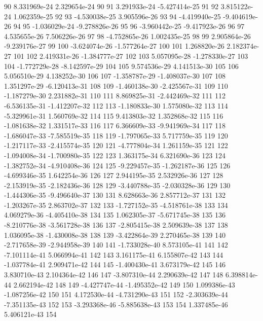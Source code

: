 \documentclass{article}
\begin{document}
\begin{Schunk}
\begin{Soutput}
90     8.331969e-24   2.329654e-24   90
91     3.291933e-24  -5.427414e-25   91
92     3.815122e-24   1.062359e-25   92
93    -4.530038e-25   3.905596e-26   93
94    -4.419940e-25  -9.404619e-26   94
95    -1.036029e-24  -9.278826e-26   95
96    -3.960442e-25  -9.417923e-26   96
97     4.535655e-26   7.506226e-26   97
98    -4.752865e-26   1.002435e-25   98
99     2.905864e-26  -9.239176e-27   99
100   -3.624074e-26  -1.577264e-27  100
101    1.268820e-26   2.182374e-27  101
102    2.419331e-26  -1.384777e-27  102
103    5.057095e-28  -1.278330e-27  103
104   -1.772729e-28  -8.142597e-29  104
105    9.574536e-29   4.141513e-30  105
106    5.056510e-29   4.138252e-30  106
107   -1.358787e-29  -1.408037e-30  107
108    1.351297e-29  -6.120413e-31  108
109   -1.460138e-30  -2.425567e-31  109
110   -1.187279e-30   2.231882e-31  110
111    8.869825e-31  -2.442469e-32  111
112   -6.536135e-31  -1.412207e-32  112
113   -1.180833e-30   1.575080e-32  113
114   -5.329961e-31   1.560769e-32  114
115    9.413803e-32   1.352868e-32  115
116   -1.081638e-32   1.331517e-33  116
117    6.366609e-33  -9.941969e-34  117
118   -1.686047e-33  -7.585519e-35  118
119   -1.797065e-33   5.717759e-35  119
120   -1.217117e-33  -2.415574e-35  120
121   -4.777804e-34   1.261159e-35  121
122   -1.094008e-34  -1.700980e-35  122
123    1.363175e-34   6.321690e-36  123
124   -1.382752e-34  -4.910408e-36  124
125   -9.229457e-35  -1.262187e-36  125
126   -4.699346e-35   1.642254e-36  126
127    2.944195e-35   2.532926e-36  127
128   -2.153919e-35  -2.182436e-36  128
129   -3.440788e-35  -2.030328e-36  129
130   -1.444306e-35  -9.496640e-37  130
131    8.628663e-36   2.857712e-37  131
132   -1.203267e-35   2.863702e-37  132
133   -1.727152e-35  -4.518761e-38  133
134    4.069279e-36  -4.405410e-38  134
135    1.062305e-37  -5.671745e-38  135
136   -8.210776e-38  -3.561728e-38  136
137   -2.805415e-38   2.509639e-38  137
138    1.036095e-38  -1.430008e-38  138
139   -3.422864e-39   2.270465e-38  139
140   -2.717658e-39  -2.944958e-39  140
141   -1.733028e-40   8.573105e-41  141
142   -7.101114e-41   5.066994e-41  142
143    3.161175e-41   6.155807e-42  143
144   -1.037784e-41   2.909471e-42  144
145   -1.400430e-41   3.673179e-42  145
146    3.830710e-43   2.104364e-42  146
147   -3.807310e-44   2.290639e-42  147
148    6.398814e-44   2.662194e-42  148
149   -4.427747e-44  -1.495352e-42  149
150    1.099386e-43  -1.087256e-42  150
151    4.172530e-44  -4.731290e-43  151
152   -2.303639e-44  -7.351135e-43  152
153   -3.293368e-46  -5.885638e-43  153
154    1.337485e-46   5.406121e-43  154

\end{Soutput}
\end{Schunk}
\end{document}
